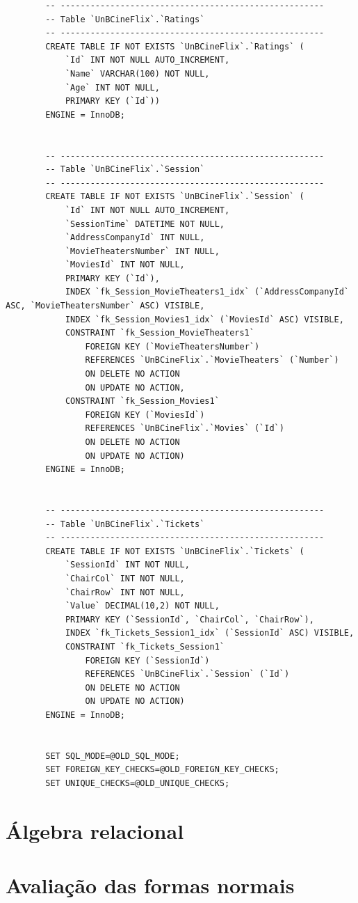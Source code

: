 \documentclass[a4paper,10pt]{article}
\begin{document}
\begin{lstlisting}
		-- -----------------------------------------------------
		-- Table `UnBCineFlix`.`Ratings`
		-- -----------------------------------------------------
		CREATE TABLE IF NOT EXISTS `UnBCineFlix`.`Ratings` (
			`Id` INT NOT NULL AUTO_INCREMENT,
			`Name` VARCHAR(100) NOT NULL,
			`Age` INT NOT NULL,
			PRIMARY KEY (`Id`))
		ENGINE = InnoDB;


		-- -----------------------------------------------------
		-- Table `UnBCineFlix`.`Session`
		-- -----------------------------------------------------
		CREATE TABLE IF NOT EXISTS `UnBCineFlix`.`Session` (
			`Id` INT NOT NULL AUTO_INCREMENT,
			`SessionTime` DATETIME NOT NULL,
			`AddressCompanyId` INT NULL,
			`MovieTheatersNumber` INT NULL,
			`MoviesId` INT NOT NULL,
			PRIMARY KEY (`Id`),
			INDEX `fk_Session_MovieTheaters1_idx` (`AddressCompanyId` ASC, `MovieTheatersNumber` ASC) VISIBLE,
			INDEX `fk_Session_Movies1_idx` (`MoviesId` ASC) VISIBLE,
			CONSTRAINT `fk_Session_MovieTheaters1`
				FOREIGN KEY (`MovieTheatersNumber`)
				REFERENCES `UnBCineFlix`.`MovieTheaters` (`Number`)
				ON DELETE NO ACTION
				ON UPDATE NO ACTION,
			CONSTRAINT `fk_Session_Movies1`
				FOREIGN KEY (`MoviesId`)
				REFERENCES `UnBCineFlix`.`Movies` (`Id`)
				ON DELETE NO ACTION
				ON UPDATE NO ACTION)
		ENGINE = InnoDB;


		-- -----------------------------------------------------
		-- Table `UnBCineFlix`.`Tickets`
		-- -----------------------------------------------------
		CREATE TABLE IF NOT EXISTS `UnBCineFlix`.`Tickets` (
			`SessionId` INT NOT NULL,
			`ChairCol` INT NOT NULL,
			`ChairRow` INT NOT NULL,
			`Value` DECIMAL(10,2) NOT NULL,
			PRIMARY KEY (`SessionId`, `ChairCol`, `ChairRow`),
			INDEX `fk_Tickets_Session1_idx` (`SessionId` ASC) VISIBLE,
			CONSTRAINT `fk_Tickets_Session1`
				FOREIGN KEY (`SessionId`)
				REFERENCES `UnBCineFlix`.`Session` (`Id`)
				ON DELETE NO ACTION
				ON UPDATE NO ACTION)
		ENGINE = InnoDB;


		SET SQL_MODE=@OLD_SQL_MODE;
		SET FOREIGN_KEY_CHECKS=@OLD_FOREIGN_KEY_CHECKS;
		SET UNIQUE_CHECKS=@OLD_UNIQUE_CHECKS;
\end{lstlisting}

\section{Álgebra relacional}

\section{Avaliação das formas normais}

%
% 
\end{document}
